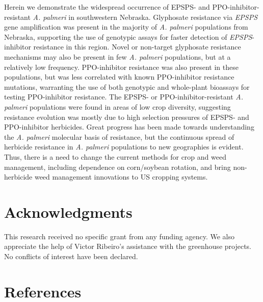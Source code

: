 \documentclass[10pt,letterpaper]{article}
\begin{document}
Herein we demonstrate the widespread occurrence of EPSPS- and
PPO-inhibitor-resistant \emph{A. palmeri} in southwestern Nebraska.
Glyphosate resistance via \emph{EPSPS} gene amplification was present in
the majority of \emph{A. palmeri} populations from Nebraska, supporting
the use of genotypic assays for faster detection of
\emph{EPSPS}-inhibitor resistance in this region. Novel or non-target
glyphosate resistance mechanisms may also be present in few \emph{A.
palmeri} populations, but at a relatively low frequency. PPO-inhibitor
resistance was also present in these populations, but was less
correlated with known PPO-inhibitor resistance mutations, warranting the
use of both genotypic and whole-plant bioassays for testing
PPO-inhibitor resistance. The EPSPS- or PPO-inhibitor-resistant \emph{A.
palmeri} populations were found in areas of low crop diversity,
suggesting resistance evolution was mostly due to high selection
pressures of EPSPS- and PPO-inhibitor herbicides. Great progress has
been made towards understanding the \emph{A. palmeri} molecular basis of
resistance, but the continuous spread of herbicide resistance in
\emph{A. palmeri} populations to new geographies is evident. Thus, there
is a need to change the current methods for crop and weed management,
including dependence on corn/soybean rotation, and bring non-herbicide
weed management innovations to US cropping systems.

\hypertarget{acknowledgments}{%
\section{Acknowledgments}\label{acknowledgments}}

This research received no specific grant from any funding agency. We
also appreciate the help of Victor Ribeiro's assistance with the
greenhouse projects. No conflicts of interest have been declared.

\hypertarget{references}{%
\section*{References}\label{references}}
\end{document}
